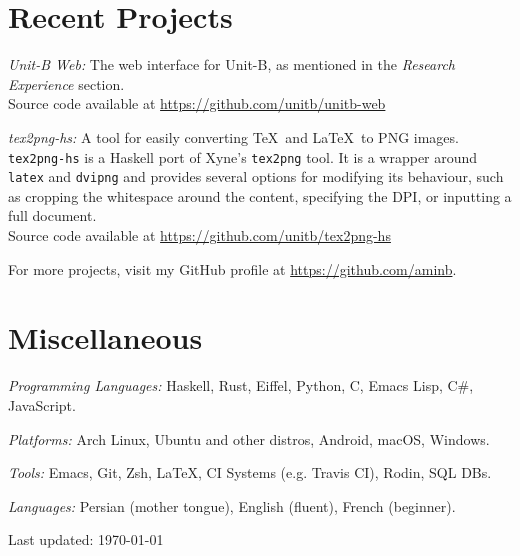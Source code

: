 \documentclass[12pt,letterpaper]{article}
\renewenvironment{itemize}{
  \begin{list}{}{
    \setlength{\leftmargin}{1.5em}
    \setlength{\itemsep}{0.25em}
    \setlength{\parskip}{0pt}
    \setlength{\parsep}{0.25em}
  }
}{
  \end{list}
}
\begin{document}
\section*{Recent Projects}

\begin{itemize}
\item \textit{Unit-B Web:} The web interface for Unit-B, as mentioned in the
  \textit{Research Experience} section.\\
  Source code available at
  \href{https://github.com/unitb/unitb-web}{https://github.com/unitb/unitb-web}

\item \textit{tex2png-hs:} A tool for easily converting \TeX\ and \LaTeX\ to PNG
  images. \verb#tex2png-hs# is a Haskell port of Xyne's \verb#tex2png# tool. It
  is a wrapper around \verb#latex# and \verb#dvipng# and provides several
  options for modifying its behaviour, such as cropping the whitespace around
  the content, specifying the DPI, or inputting a full document.\\
  Source code available at
  \href{https://github.com/unitb/tex2png-hs}{https://github.com/unitb/tex2png-hs}

\item For more projects, visit my GitHub profile at
  \href{https://github.com/aminb}{https://github.com/aminb}.
\end{itemize}

\section*{Miscellaneous}

\begin{itemize}
\item \textit{Programming Languages:} Haskell, Rust, Eiffel, Python, C, Emacs
  Lisp, C\#, JavaScript.
\item \textit{Platforms:} Arch Linux, Ubuntu and other distros, Android, macOS,
  Windows.
\item \textit{Tools:} Emacs, Git, Zsh, \LaTeX, CI Systems (e.g. Travis CI),
  Rodin, SQL DBs.
\item \textit{Languages:} Persian (mother tongue), English (fluent), French
  (beginner).
\end{itemize}


\bigskip
{\small Last updated: \today}
\end{document}
